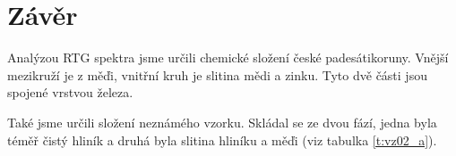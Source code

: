 \section*{Závěr}
Analýzou RTG spektra jsme určili chemické složení české padesátikoruny. Vnější mezikruží je z měďi, vnitřní kruh je slitina mědi a zinku. Tyto dvě části jsou spojené vrstvou železa.

Také jsme určili složení neznámého vzorku. Skládal se ze dvou fází, jedna byla téměř čistý hliník a druhá byla slitina hliníku a měďi (viz tabulka \ref{t:vz02_a}).